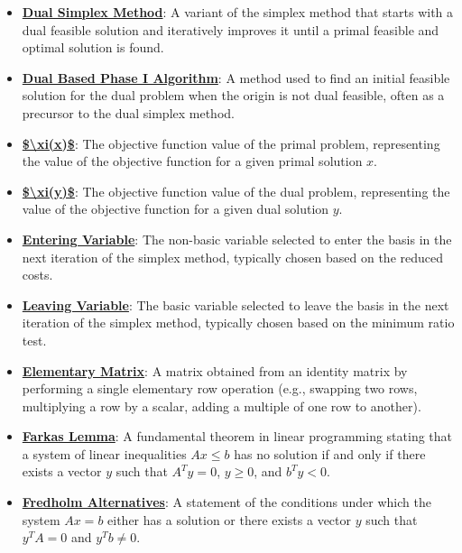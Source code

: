 \documentclass{article}%
\begin{document}
\begin{itemize}[leftmargin=*]%
\item \href{https://www.math.purdue.edu/~yipn/421//2024-10-03-DualSimplexMatrix.pdf#page=2}{\textbf{Dual Simplex Method}}: A variant of the simplex method that starts with a dual feasible solution and iteratively improves it until a primal feasible and optimal solution is found.%
\item \href{https://www.math.purdue.edu/~yipn/421//2024-10-03-DualSimplexMatrix.pdf#page=5}{\textbf{Dual Based Phase I Algorithm}}: A method used to find an initial feasible solution for the dual problem when the origin is not dual feasible, often as a precursor to the dual simplex method.%
\item \href{https://www.math.purdue.edu/~yipn/421//2024-10-03-DualSimplexMatrix.pdf#page=1}{\textbf{\$\textbackslash{}xi(x)\$}}: The objective function value of the primal problem, representing the value of the objective function for a given primal solution $x$.%
\item \href{https://www.math.purdue.edu/~yipn/421//2024-10-03-DualSimplexMatrix.pdf#page=1}{\textbf{\$\textbackslash{}xi(y)\$}}: The objective function value of the dual problem, representing the value of the objective function for a given dual solution $y$.%
\item \href{https://www.math.purdue.edu/~yipn/421//2024-10-03-DualSimplexMatrix.pdf#page=9}{\textbf{Entering Variable}}: The non-basic variable selected to enter the basis in the next iteration of the simplex method, typically chosen based on the reduced costs.%
\item \href{https://www.math.purdue.edu/~yipn/421//2024-10-03-DualSimplexMatrix.pdf#page=10}{\textbf{Leaving Variable}}: The basic variable selected to leave the basis in the next iteration of the simplex method, typically chosen based on the minimum ratio test.%
\item \href{https://www.math.purdue.edu/~yipn/421//2024-10-03-DualSimplexMatrix.pdf#page=15}{\textbf{Elementary Matrix}}: A matrix obtained from an identity matrix by performing a single elementary row operation (e.g., swapping two rows, multiplying a row by a scalar, adding a multiple of one row to another).%
\end{itemize}%
\begin{itemize}[leftmargin=*]%
\item \href{https://www.math.purdue.edu/~yipn/421//2024-10-28-Farkas.pdf#page=1}{\textbf{Farkas Lemma}}: A fundamental theorem in linear programming stating that a system of linear inequalities $Ax \le b$ has no solution if and only if there exists a vector $y$ such that $A^T y = 0$, $y \ge 0$, and $b^T y < 0$.%
\item \href{https://www.math.purdue.edu/~yipn/421//2024-10-28-Farkas.pdf#page=3}{\textbf{Fredholm Alternatives}}: A statement of the conditions under which the system $Ax = b$ either has a solution or there exists a vector $y$ such that $y^T A = 0$ and $y^T b \neq 0$.%
\end{itemize}%
\end{document}
